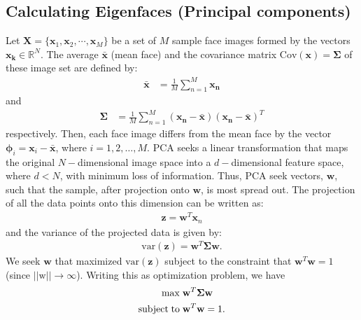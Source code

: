 \subsection{Calculating Eigenfaces (Principal components)}
Let $\mathbf{X}=\lbrace \mathbf{x}_1, \mathbf{x}_2, \cdots, \mathbf{x}_M\rbrace$ be a set of $M$ sample face images formed by the vectors $\mathbf{x_k}\in \mathbb{R}^N$. The average $\mathbf{\bar{x}}$ (mean face) and the covariance matrix $\mathrm{Cov}(\mathbf{x})= \mathbf{\Sigma}$ of these image set are defined by: \begin{align*}
\mathbf{\bar{x}} &= \frac{1}{M}\sum_{n=1}^{M} \mathbf{x_n} 
\end{align*} and \begin{align*}
\mathbf{\Sigma}& = \frac{1}{M}\sum_{n=1}^{M}(\mathbf{x_n} -\mathbf{\bar{x}})(\mathbf{x_n} -\mathbf{\bar{x}})^T
\end{align*}
respectively. Then, each face image differs from the mean face by the vector $\mathbf{\phi}_i = \mathbf{x}_i -\mathbf{\bar{x}}$, where $i = 1, 2, \ldots, M$. PCA seeks a linear transformation that maps the original $N-$dimensional image space into a $d-$dimensional feature space, where $d<N$, with minimum loss of information. Thus, PCA seek vectors, $\mathbf{w}$, such that the sample, after projection onto $\mathbf{w}$, is most spread out. 
The projection of all the data points onto this dimension can be written as: \begin{align*}
\mathbf{z} = \mathbf{w}^T \mathbf{x}_n
\end{align*}
and the variance of the projected data is given by: \begin{align}
\mathrm{var}(\mathbf{z}) = \mathbf{w}^T \mathbf{\Sigma}\mathbf{w}.
\end{align}
We seek $\mathbf{w}$ that maximized $\mathrm{var}(\mathbf{z})$   subject to the constraint that $\mathbf{w}^T\mathbf{w}=1$ (since $|| \mathrm{w}|| \longrightarrow \infty$). Writing this as optimization problem, we have \begin{align}
\mathrm{max}\; &\mathbf{w}^T \mathbf{\Sigma}\mathbf{w} \notag\\
\mathrm{subject \; to}\; &\mathbf{w}^T\mathbf{w}= 1.
\end{align}

